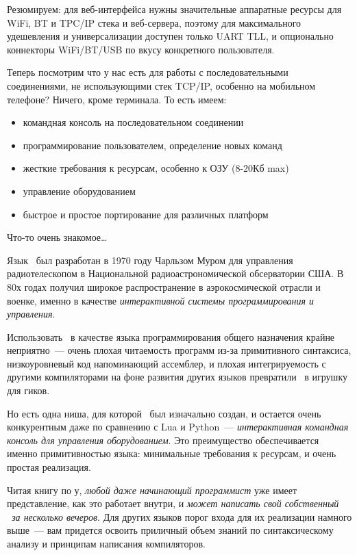 \clearpage
{}

\noindent
Резюмируем: для веб-интерфейса нужны значительные аппаратные ресурсы для WiFi,
BT и TPC/IP стека и веб-сервера, поэтому для максимального удешевления и
универсализации доступен только UART TLL, и опционально коннекторы WiFi/BT/USB
по вкусу конкретного пользователя.

\medskip
Теперь посмотрим что у нас есть для работы с последовательными соединениями, не
использующими стек TCP/IP, особенно на мобильном телефоне? Ничего, кроме
терминала. То есть имеем:
\begin{itemize}[nosep]
  \item командная консоль на последовательном соединении
  \item программирование пользователем, определение новых команд
  \item жесткие требования к ресурсам, особенно к ОЗУ (8-20Кб max)
  \item управление оборудованием
  \item быстрое и простое портирование для различных платформ
\end{itemize}
Что-то очень знакомое\ldots

\clearpage
Язык \F\ был разработан в 1970 году Чарльзом Муром для управления
радиотелескопом в Национальной радиоастрономической обсерватории США. В 80х
годах получил широкое распространение в аэрокосмической отрасли и военке, именно
в качестве \emph{интерактивной системы программирования и управления}.

Использовать \F\ в качестве языка программирования общего назначения крайне
неприятно\ --- очень плохая читаемость программ из-за примитивного синтаксиса,
низкоуровневый код напоминающий ассемблер, и плохая интегрируемость с другими
компиляторами на фоне развития других языков превратили \F\ в игрушку для гиков.

Но есть одна ниша, для которой \F\ был изначально создан, и остается
очень конкурентным даже по сравнению с Lua и Python\ --- \emph{интерактивная
командная консоль для управления оборудованием}. Это преимущество обеспечивается
именно примитивностью языка: минимальные требования к ресурсам, и очень простая
реализация.

\clearpage
Читая книгу по \F у, \emph{любой даже начинающий программист} уже имеет
представление, как это работает внутри, и \emph{может написать свой собственный
\F\ за несколько вечеров}. Для других языков порог входа для их реализации
намного выше\ --- вам придется освоить приличный объем знаний по синтаксическому
анализу и принципам написания компиляторов.

